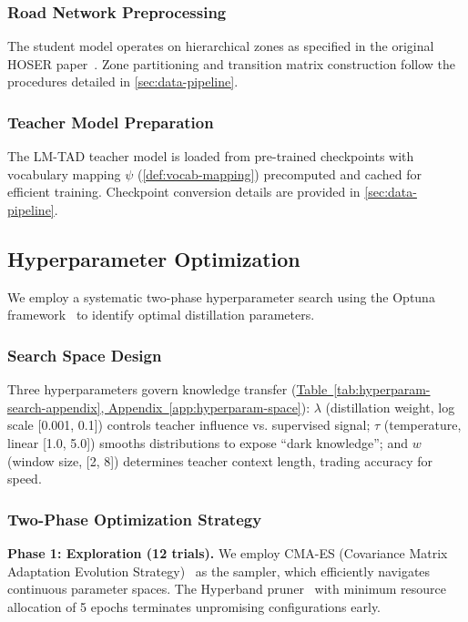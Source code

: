 \subsubsection{Road Network Preprocessing}

The student model operates on hierarchical zones as specified in the original HOSER paper~\cite{caoHolisticSemanticRepresentation2025}. Zone partitioning and transition matrix construction follow the procedures detailed in \autoref{sec:data-pipeline}.

\subsubsection{Teacher Model Preparation}

The LM-TAD teacher model is loaded from pre-trained checkpoints with vocabulary mapping $\psi$ (\autoref{def:vocab-mapping}) precomputed and cached for efficient training. Checkpoint conversion details are provided in \autoref{sec:data-pipeline}.

\subsection{Hyperparameter Optimization}
\label{sec:impl-hparam}

We employ a systematic two-phase hyperparameter search using the Optuna framework~\cite{akibaOptunaNextgenerationHyperparameter2019} to identify optimal distillation parameters.

\subsubsection{Search Space Design}

Three hyperparameters govern knowledge transfer (\hyperref[app:hyperparam-space]{Table~\ref*{tab:hyperparam-search-appendix}, Appendix~\ref*{app:hyperparam-space}}): $\lambda$ (distillation weight, log scale [0.001, 0.1]) controls teacher influence vs. supervised signal; $\tau$ (temperature, linear [1.0, 5.0]) smooths distributions to expose ``dark knowledge''; and $w$ (window size, [2, 8]) determines teacher context length, trading accuracy for speed.

\subsubsection{Two-Phase Optimization Strategy}

\textbf{Phase 1: Exploration (12 trials).} We employ CMA-ES (Covariance Matrix Adaptation Evolution Strategy)~\cite{hansenCMAEvolutionStrategy2023} as the sampler, which efficiently navigates continuous parameter spaces. The Hyperband pruner~\cite{liHyperbandNovelBanditBased2018} with minimum resource allocation of 5 epochs terminates unpromising configurations early.

